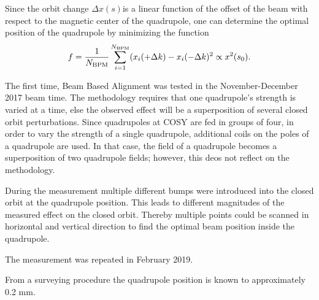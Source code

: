 Since the orbit change $\Delta x(s)$is a linear function of the offset of the beam with respect to the magnetic center of the quadrupole, one can determine the optimal position of the quadrupole by minimizing the function
\[
f = \frac{1}{N_{\mathrm{BPM}}}\sum_{i=1}^{N_{\mathrm{BPM}}} (x_i(+\Delta k) -x_i(-\Delta k)^2 \propto x^2(s_0).
\]

The first time, Beam Based Alignment was tested in the November-December 2017 beam time. The methodology requires that one quadrupole's strength is varied at a time, else the observed effect will be a superposition
of several closed orbit perturbations. Since quadrupoles at COSY are fed in groups of four, in order to vary the strength of a single quadrupole, additional coils on the poles of a quadrupole are used. In that case, 
the field of a quadrupole becomes a superposition of two quadrupole fields; however, this deos not reflect on the methodology. 

During the measurement multiple different bumps were introduced into the closed orbit
at the quadrupole position. This leads to different magnitudes of the measured effect on the
closed orbit. Thereby multiple points could be scanned in horizontal and vertical direction
to find the optimal beam position inside the quadrupole.~\cite[p.~60]{Wagner:BBA2018}

The measurement was repeated in February 2019.

From a surveying procedure the quadrupole position is known to approximately 0.2 mm.~\cite[\textbf{Results and achievements at COSY}]{YellowReport}
